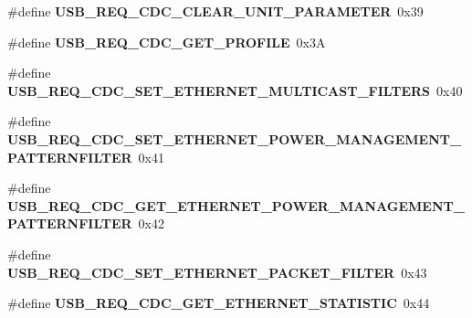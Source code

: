 \begin{DoxyCompactItemize}
\item 
\mbox{\label{group__cdc__protocol__group_ga27d474737f5224baecff3f702aea647c}} 
\#define {\bfseries U\+S\+B\+\_\+\+R\+E\+Q\+\_\+\+C\+D\+C\+\_\+\+C\+L\+E\+A\+R\+\_\+\+U\+N\+I\+T\+\_\+\+P\+A\+R\+A\+M\+E\+T\+ER}~0x39
\item 
\mbox{\label{group__cdc__protocol__group_ga4f0045336cd0d38e988a424bbcb8fce3}} 
\#define {\bfseries U\+S\+B\+\_\+\+R\+E\+Q\+\_\+\+C\+D\+C\+\_\+\+G\+E\+T\+\_\+\+P\+R\+O\+F\+I\+LE}~0x3A
\item 
\mbox{\label{group__cdc__protocol__group_ga68617aa6e12d072222b232ab71f9e226}} 
\#define {\bfseries U\+S\+B\+\_\+\+R\+E\+Q\+\_\+\+C\+D\+C\+\_\+\+S\+E\+T\+\_\+\+E\+T\+H\+E\+R\+N\+E\+T\+\_\+\+M\+U\+L\+T\+I\+C\+A\+S\+T\+\_\+\+F\+I\+L\+T\+E\+RS}~0x40
\item 
\mbox{\label{group__cdc__protocol__group_ga43abcd76b528dfc9cf1efbf3ba37bab0}} 
\#define {\bfseries U\+S\+B\+\_\+\+R\+E\+Q\+\_\+\+C\+D\+C\+\_\+\+S\+E\+T\+\_\+\+E\+T\+H\+E\+R\+N\+E\+T\+\_\+\+P\+O\+W\+E\+R\+\_\+\+M\+A\+N\+A\+G\+E\+M\+E\+N\+T\+\_\+\+P\+A\+T\+T\+E\+R\+N\+F\+I\+L\+T\+ER}~0x41
\item 
\mbox{\label{group__cdc__protocol__group_ga4bcd264cbcf653c18532ed313b818ee5}} 
\#define {\bfseries U\+S\+B\+\_\+\+R\+E\+Q\+\_\+\+C\+D\+C\+\_\+\+G\+E\+T\+\_\+\+E\+T\+H\+E\+R\+N\+E\+T\+\_\+\+P\+O\+W\+E\+R\+\_\+\+M\+A\+N\+A\+G\+E\+M\+E\+N\+T\+\_\+\+P\+A\+T\+T\+E\+R\+N\+F\+I\+L\+T\+ER}~0x42
\item 
\mbox{\label{group__cdc__protocol__group_ga7d4e4730f093e5af9870351470093562}} 
\#define {\bfseries U\+S\+B\+\_\+\+R\+E\+Q\+\_\+\+C\+D\+C\+\_\+\+S\+E\+T\+\_\+\+E\+T\+H\+E\+R\+N\+E\+T\+\_\+\+P\+A\+C\+K\+E\+T\+\_\+\+F\+I\+L\+T\+ER}~0x43
\item 
\mbox{\label{group__cdc__protocol__group_gaa035e847093134f53d71bd46d346a7fc}} 
\#define {\bfseries U\+S\+B\+\_\+\+R\+E\+Q\+\_\+\+C\+D\+C\+\_\+\+G\+E\+T\+\_\+\+E\+T\+H\+E\+R\+N\+E\+T\+\_\+\+S\+T\+A\+T\+I\+S\+T\+IC}~0x44
\item 
\mbox{\label{group__cdc__protocol__group_ga95ef1719d5a884fec7ee4c2d7db80d82}} 

\end{DoxyCompactItemize}
